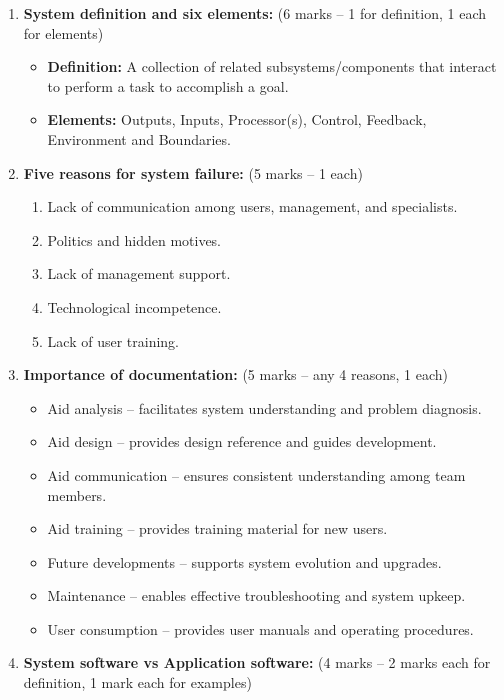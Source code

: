 \documentclass[12pt]{article}
\begin{document}
\begin{enumerate}[label=(\alph*)]
    \item \textbf{System definition and six elements:} \hfill (6 marks -- 1 for definition, 1 each for elements)
    \begin{itemize}
        \item \textbf{Definition:} A collection of related subsystems/components that interact to perform a task to accomplish a goal.
        \item \textbf{Elements:} Outputs, Inputs, Processor(s), Control, Feedback, Environment and Boundaries.
    \end{itemize}

    \item \textbf{Five reasons for system failure:} \hfill (5 marks -- 1 each)
    \begin{enumerate}
        \item Lack of communication among users, management, and specialists.
        \item Politics and hidden motives.
        \item Lack of management support.
        \item Technological incompetence.
        \item Lack of user training.
    \end{enumerate}

    \item \textbf{Importance of documentation:} \hfill (5 marks -- any 4 reasons, 1 each)
    \begin{itemize}
        \item Aid analysis – facilitates system understanding and problem diagnosis.
        \item Aid design – provides design reference and guides development.
        \item Aid communication – ensures consistent understanding among team members.
        \item Aid training – provides training material for new users.
        \item Future developments – supports system evolution and upgrades.
        \item Maintenance – enables effective troubleshooting and system upkeep.
        \item User consumption – provides user manuals and operating procedures.
    \end{itemize}

    \item \textbf{System software vs Application software:} \hfill (4 marks -- 2 marks each for definition, 1 mark each for examples)


\end{enumerate}
\end{document}
